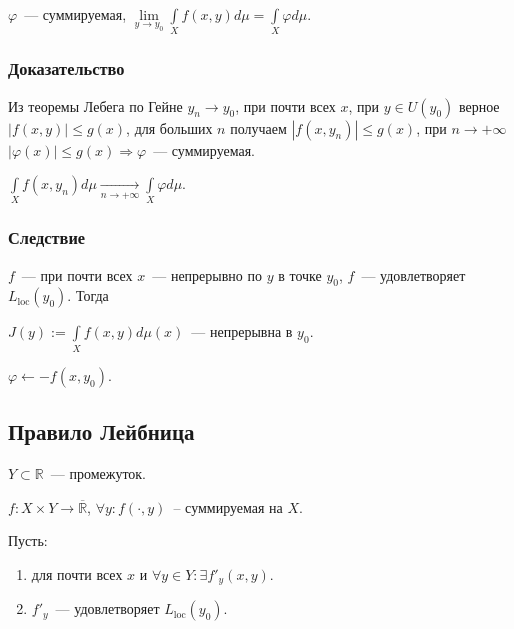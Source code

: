 \documentclass{article}
\begin{document}
        $\varphi$~--- суммируемая, $\lim\limits_{y \rightarrow y_0} \int\limits_X f(x, y) d \mu = \int\limits_X \varphi d \mu$.
    
        \subsubsection{Доказательство}
        
            Из теоремы Лебега по Гейне $y_n \rightarrow y_0$, при почти всех $x$, при $y \in U(y_0)$ верное $\left| f(x, y) \right| \leqslant g(x)$, для больших $n$ получаем $\left| f(x, y_n) \right| \leqslant g(x)$, при $n \rightarrow +\infty$ $\left| \varphi(x) \right| \leqslant g(x) \Rightarrow \varphi$~--- суммируемая.
            
            $\int\limits_X f(x, y_n) d \mu \xrightarrow[n \rightarrow +\infty]{} \int\limits_X \varphi d \mu$.
            
        \subsubsection{Следствие}
        
            $f$~--- при почти всех $x$~--- непрерывно по $y$ в точке $y_0$, $f$~--- удовлетворяет $L_{\mathrm{loc}}(y_0)$. Тогда
            
            $J(y) := \int\limits_X f(x, y) d \mu (x)$~--- непрерывна в $y_0$.
            
            $\varphi \leftarrow -f(x, y_0)$.
            
    \subsection{Правило Лейбница}
    
        $Y \subset \mathbb{R}$~--- промежуток.
        
        $f : X \times Y \rightarrow \overline{\mathbb{R}}$, $\forall y : f (\cdot, y)$~-- суммируемая на $X$. 
        
        Пусть:
        
        \begin{enumerate}
        
            \item для почти всех $x$ и $\forall y \in Y : \exists f'_y(x, y)$.
            
            \item $f'_y$~--- удовлетворяет $L_{\mathrm{loc}}(y_0)$.
            
        \end{enumerate}
        
\end{document}
